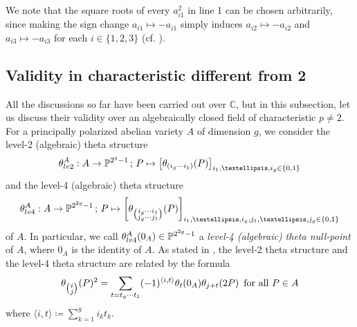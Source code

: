 \documentclass{amsart}
\theoremstyle{definition}
\theoremstyle{plain}
\begin{document}
\noindent We note that the square roots of every $a_{i1}^2$ in line 1 can be chosen arbitrarily, since making the sign change $a_{i1} \mapsto -a_{i1}$ simply induces $a_{i2} \mapsto -a_{i2}$ and $a_{i3} \mapsto -a_{i3}$ for each $i \in \{1,2,3\}$ (cf. \cite[p.\,1361]{Milio}).

\subsection{Validity in characteristic different from 2}\label{algebraic}
All the discussions so far have been carried out over $\mathbb{C}$, but in this subsection, let us discuss their validity over an algebraically closed field of characteristic $p \neq 2$.
For a principally polarized abelian variety $A$ of dimension $g$, we consider the level-2 (algebraic) theta structure
\[
    \theta^A_{\rm lv2}: A \rightarrow \mathbb{P}^{2^g-1}\,;\, P \mapsto \bigl[\theta_{(i_g \cdots i_1)}(P)\bigr]_{i_1,\ldots,i_g \in \{0,1\}}
\]
and the level-4 (algebraic) theta structure
\[
    \theta^A_{\rm lv4}: A \rightarrow \mathbb{P}^{2^{2g}-1}\,;\, P \mapsto \biggl[\theta_{\bigl(\substack{i_g \cdots i_1\\[-0.5mm]j_g \cdots j_1}\bigr)}(P)\biggr]_{i_1,\ldots,i_g,j_1,\ldots,j_g \in \{0,1\}}
\]
of $A$.
In particular, we call $\theta^A_{\rm lv4}(0_A) \in \mathbb{P}^{2^{2g}-1}$ a \emph{level-4 (algebraic) theta null-point} of $A$, where $0_A$ is the identity of $A$.
As stated in \cite[Chapter 4, Proposition 5.2]{Robert}, the level-2 theta structure and the level-4 theta structure are related by the formula
\begin{equation}\label{dupl-algebraic}
    \theta_{\bigl(\substack{i\\[0.1mm]j}\bigr)}(P)^2 = \sum_{t=t_g \cdots t_1} (-1)^{\langle i,t\rangle}\theta_t(0_A)\theta_{j+t}(2P)\ \,\text{for all } P \in A\smallskip
\end{equation}
where $\langle i,t \rangle \coloneqq \sum_{k=1}^g i_kt_k$.\vspace{-0.5mm}
\end{document}
